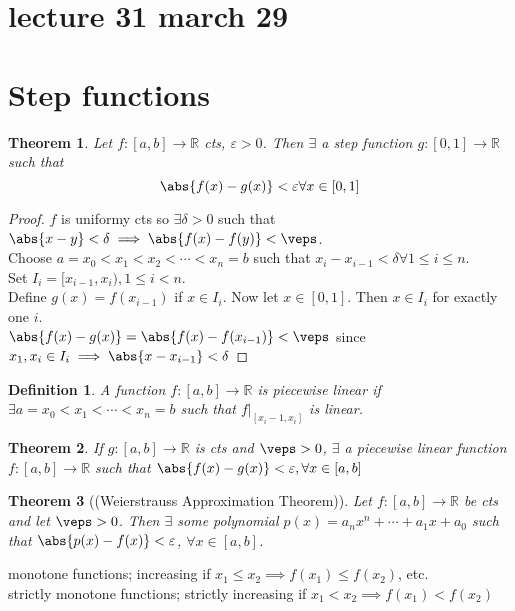 \documentclass{report}
\newcommand{\R}{\mathbb{R}}  %
\theoremstyle{mystyle}
\newtheorem*{theorem}{Theorem}
\newtheorem*{definition}{Definition}
\theoremstyle{customtheorem}
\begin{document}
\section*{lecture 31 march 29}
\section*{Step functions}
\begin{theorem}
    Let $f:[a,b]\to\R$ cts, $\varepsilon>0$. Then $\exists$ a step function $g:[0,1]\to\R$ such that \[\abs{f(x)-g(x)}<\varepsilon \forall x\in[0,1]\]
\end{theorem}
\begin{proof}
    $f$ is uniformy cts so $\exists\delta>0$ such that $\abs{x-y}<\delta\implies\abs{f(x)-f(y)} <\veps$.\\
    Choose $a=x_0<x_1<x_2<\cdots<x_n=b$ such that $x_i-x_{i-1}<\delta\forall 1\leq i\leq n$. \\
    Set $I_i=[x_{i-1}, x_i), 1\leq i<n$. \\
    Define $g(x)=f(x_{i-1})$ if $x\in I_i$. Now let $x\in[0,1]$. Then $x\in I_i$ for exactly one $i$. \\
    $\abs{f(x)-g(x)}=\abs{f(x)-f(x_{i-1})} <\veps$ since $x_1, x_i\in I_i\implies\abs{x-x_{i-1}}<\delta$
\end{proof}

\begin{definition}
    A function $f:[a,b]\to\R$ is piecewise linear if $\exists a=x_0<x_1<\cdots<x_n=b$ such that $f\vert_{[x_i-1,x_i]}$ is linear.
\end{definition}

\begin{theorem}
    If $g:[a,b]\to\R$ is cts and $\veps>0$, $\exists$ a piecewise linear function $f:[a,b]\to\R$ such that $\abs{f(x)-g(x)}<\varepsilon, \forall x\in[a,b]$
\end{theorem}

\begin{theorem}[(Weierstrauss Approximation Theorem)]
    Let $f:[a,b]\to\R$ be cts and let $\veps>0$. Then $\exists$ some polynomial $p(x)=a_nx^n+\cdots+a_1x+a_0$ such that $\abs{p(x)-f(x)}<\varepsilon$, $\forall x\in[a,b]$.
\end{theorem}

monotone functions; increasing if $x_1\leq x_2 \implies f(x_1)\leq f(x_2)$, etc.\\
strictly monotone functions; strictly increasing if $x_1< x_2 \implies f(x_1)< f(x_2)$
\end{document}
